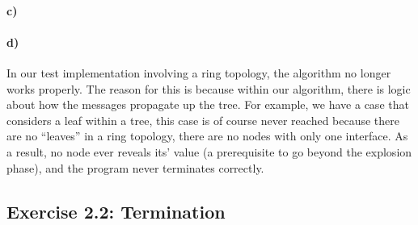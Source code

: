 \documentclass[12pt,a4paper]{article}
\begin{document}
\paragraph{c)} %
\paragraph{d)} %
In our test implementation involving a ring topology, the algorithm no longer works properly. The reason for this is because within our algorithm, there is logic about how the messages propagate up the tree. For example, we have a case that considers a leaf within a tree, this case is of course never reached because there are no ``leaves'' in a ring topology, there are no nodes with only one interface. As a result, no node ever reveals its' value (a prerequisite to go beyond the explosion phase), and the program never terminates correctly.
\subsection*{Exercise 2.2: Termination}
\end{document}
